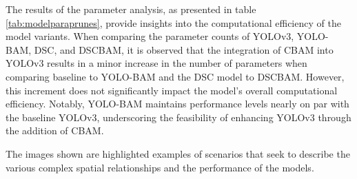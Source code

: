 The results of the parameter analysis, as presented in table \ref{tab:modelparaprunes}, provide insights into the computational efficiency of the model variants. When comparing the parameter counts of YOLOv3, YOLO-BAM, DSC, and DSCBAM, it is observed that the integration of CBAM into YOLOv3 results in a minor increase in the number of parameters when comparing baseline to YOLO-BAM and the DSC model to DSCBAM. However, this increment does not significantly impact the model's overall computational efficiency. Notably, YOLO-BAM maintains performance levels nearly on par with the baseline YOLOv3, underscoring the feasibility of enhancing YOLOv3 through the addition of CBAM.

The images shown are highlighted examples of scenarios that seek to describe the various complex spatial relationships and the performance of the models.

